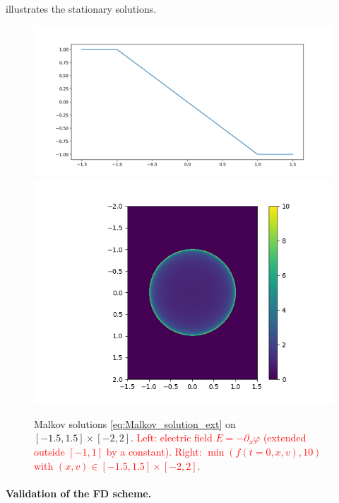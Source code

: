 \documentclass{article}
\numberwithin{equation}{section}
\newcommand{\mysubcaption}[1]{
	\vspace*{5pt}
	\begin{minipage}{0.8\linewidth}
		\begin{center}
			\footnotesize\emph{#1}
		\end{center}
	\end{minipage}
}
\newcommand{\imh}{\textheight} %
\begin{document}
 illustrates the stationary solutions.

\begin{figure}
	\centering
	\renewcommand{\imh}{0.33\linewidth}
	\includegraphics[trim = 50 10 55 30, clip, height=\imh]{images/malkov_solution_Ee}
	\includegraphics[trim = 100 10 60 30, clip, height=\imh]{images/malkov_solution_fe}
	\caption{Malkov solutions \cref{eq:Malkov_solution_ext} on $[-1.5,1.5]\times[-2,2]$. \textcolor{red}{Left: electric field $E=-\partial_x \varphi$ (extended outside $[-1, 1]$ by a constant). Right: $\min(f(t=0, x, v), 10)$ with $(x,v) \in [-1.5,1.5]\times[-2,2]$}.}
	\label{fig:malkov_solutions}
\end{figure}

\paragraph{Validation of the FD scheme. }
\end{document}
